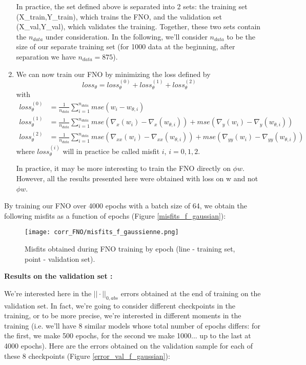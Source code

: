 \begin{enumerate}[label=\textbullet]
	\begin{Rem}
		In practice, the set defined above is separated into 2 sets: the training set (X\_train,Y\_train), which trains the FNO, and the validation set (X\_val,Y\_val), which validates the training. Together, these two sets contain the $n_{data}$ under consideration. In the following, we'll consider $n_{data}$ to be the size of our separate training set (for 1000 data at the beginning, after separation we have $n_{data}=875$). 
	\end{Rem}
	\item We can now train our FNO by minimizing the loss defined by
	\begin{equation*}
		loss_\theta = loss_\theta^{(0)} + loss_\theta^{(1)} + loss_\theta^{(2)}
	\end{equation*}
	with 
	\begin{align*}
		loss_\theta^{(0)} &= \frac{1}{n_{data}}\sum_{i=1}^{n_{data}} mse(w_i-w_{\theta,i}) \\
		loss_\theta^{(1)} &= \frac{1}{n_{data}}\sum_{i=1}^{n_{data}} mse(\nabla_x(w_i)-\nabla_x(w_{\theta,i}))+mse(\nabla_y(w_i)-\nabla_y(w_{\theta,i})) \\
		loss_\theta^{(2)} &= \frac{1}{n_{data}}\sum_{i=1}^{n_{data}} mse(\nabla_{xx}(w_i)-\nabla_{xx}(w_{\theta,i})) + mse(\nabla_{yy}(w_i)-\nabla_{yy}(w_{\theta,i}))
	\end{align*}
	where $loss_\theta^{(i)}$ will in practice be called misfit $i$, $i=0,1,2$.
	\begin{Rem}
		In practice, it may be more interesting to train the FNO directly on $\phi w$. However, all the results presented here were obtained with loss on w and not $\phi w$.
	\end{Rem}
\end{enumerate}

By training our FNO over 4000 epochs with a batch size of 64, we obtain the following misfits as a function of epochs (Figure \ref{misfits_f_gaussian}):

\begin{figure}[H]
	\centering
	\texttt{[image: corr\_FNO/misfits\_f\_gaussienne.png]}
	\caption{Misfits obtained during FNO training by epoch (line - training set, point - validation set).}
	\label{misfits_f_gaussienne}
\end{figure}

\textbf{Results on the validation set :}

We're interested here in the $||\cdot||_{0,abs}$ errors obtained at the end of training on the validation set. In fact, we're going to consider different checkpoints in the training, or to be more precise, we're interested in different moments in the training (i.e. we'll have 8 similar models whose total number of epochs differs: for the first, we make 500 epochs, for the second we make 1000... up to the last at 4000 epochs). Here are the errors obtained on the validation sample for each of these 8 checkpoints (Figure \ref{error_val_f_gaussian}):

